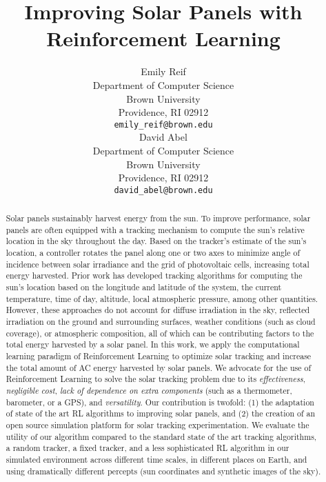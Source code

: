 \documentclass[11pt]{article}
\title{Improving Solar Panels with Reinforcement Learning}
\author{
Emily Reif \\
Department of Computer Science\\
Brown University\\
Providence, RI 02912 \\
\texttt{emily\_reif@brown.edu} \\
\And
David Abel \\
Department of Computer Science\\
Brown University \\
Providence, RI 02912 \\
\texttt{david\_abel@brown.edu} \\
}
\date{}
\begin{document}
\maketitle

\begin{abstract}
Solar panels sustainably harvest energy from the sun. To improve performance, solar panels are often equipped with a tracking mechanism to compute the sun's relative location in the sky throughout the day. Based on the tracker's estimate of the sun's location, a controller rotates the panel along one or two axes to minimize angle of incidence between solar irradiance and the grid of photovoltaic cells, increasing total energy harvested. Prior work has developed tracking algorithms for computing the sun's location based on the longitude and latitude of the system, the current temperature, time of day, altitude, local atmospheric pressure, among other quantities.
%
However, these approaches do not account for diffuse irradiation in the sky, reflected irradiation on the ground and surrounding surfaces, weather conditions (such as cloud coverage), or atmospheric composition, all of which can be contributing factors to the total energy harvested by a solar panel.
%
In this work, we apply the computational learning paradigm of Reinforcement Learning to optimize solar tracking and increase the total amount of AC energy harvested by solar panels. We advocate for the use of Reinforcement Learning to solve the solar tracking problem due to its {\it effectiveness}, {\it negligible cost}, {\it lack of dependence on extra components} (such as a thermometer, barometer, or a GPS), and {\it versatility}. Our contribution is twofold: (1) the adaptation of state of the art RL algorithms to improving solar panels, and (2) the creation of an open source simulation platform for solar tracking experimentation. We evaluate the utility of our algorithm compared to the standard state of the art tracking algorithms, a random tracker, a fixed tracker, and a less sophisticated RL algorithm in our simulated environment across different time scales, in different places on Earth, and using dramatically different percepts (sun coordinates and synthetic images of the sky).
\end{abstract}

\end{document}
